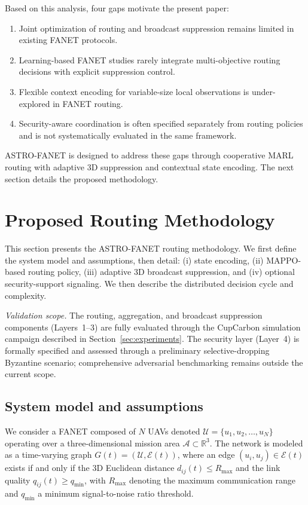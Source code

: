 \documentclass[5p,times]{elsarticle}
\begin{document}
Based on this analysis, four gaps motivate the present paper:

\begin{enumerate}
\item Joint optimization of routing and broadcast suppression remains limited in existing FANET protocols.
\item Learning-based FANET studies rarely integrate multi-objective routing decisions with explicit suppression control.
\item Flexible context encoding for variable-size local observations is under-explored in FANET routing.
\item Security-aware coordination is often specified separately from routing policies and is not systematically evaluated in the same framework.
\end{enumerate}

ASTRO-FANET is designed to address these gaps through cooperative MARL routing with adaptive 3D suppression and contextual state encoding. The next section details the proposed methodology.

\section{Proposed Routing Methodology}
\label{sec:framework}

This section presents the ASTRO-FANET routing methodology. We first define the system model and assumptions, then detail: (i) state encoding, (ii) MAPPO-based routing policy, (iii) adaptive 3D broadcast suppression, and (iv) optional security-support signaling. We then describe the distributed decision cycle and complexity.

\textit{Validation scope.} The routing, aggregation, and broadcast suppression components (Layers~1--3) are fully evaluated through the CupCarbon simulation campaign described in Section~\ref{sec:experiments}. The security layer (Layer~4) is formally specified and assessed through a preliminary selective-dropping Byzantine scenario; comprehensive adversarial benchmarking remains outside the current scope.

\subsection{System model and assumptions}
\label{subsec:system_model}

We consider a FANET composed of $N$ UAVs denoted $\mathcal{U} = \{u_1, u_2, \dots, u_N\}$ operating over a three-dimensional mission area $\mathcal{A} \subset \mathbb{R}^3$. The network is modeled as a time-varying graph $G(t) = (\mathcal{U}, \mathcal{E}(t))$, where an edge $(u_i, u_j) \in \mathcal{E}(t)$ exists if and only if the 3D Euclidean distance $d_{ij}(t) \leq R_{\max}$ and the link quality $q_{ij}(t) \geq q_{\min}$, with $R_{\max}$ denoting the maximum communication range and $q_{\min}$ a minimum signal-to-noise ratio threshold.
\end{document}
